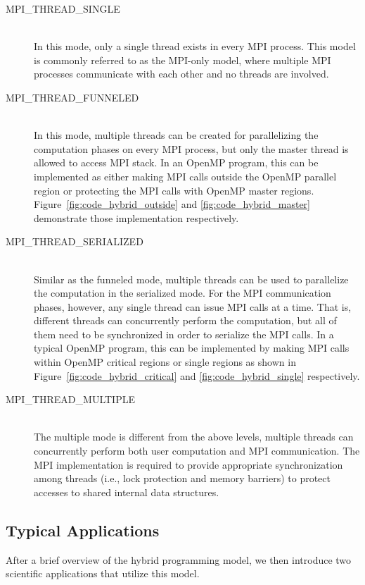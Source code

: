 \begin{description}
\item[MPI\_THREAD\_SINGLE] \hfill \\
In this mode, only a single thread exists in every MPI process. This
model is commonly referred to as the MPI-only model, where multiple
MPI processes communicate with each other and no threads are involved.

\item[MPI\_THREAD\_FUNNELED] \hfill \\
In this mode, multiple threads can be created for parallelizing the
computation phases on every MPI process, but only the master thread is
allowed to access MPI stack. In an OpenMP program, this can be implemented
as either making MPI calls outside the OpenMP parallel region or protecting
the MPI calls with OpenMP master regions. Figure~\ref{fig:code_hybrid_outside}
and \ref{fig:code_hybrid_master} demonstrate those implementation
respectively.

\item[MPI\_THREAD\_SERIALIZED] \hfill \\
Similar as the funneled mode, multiple threads can be used to parallelize
the computation in the serialized mode. For the MPI communication phases,
however, any single thread can issue MPI calls at a time. That is, different
threads can concurrently perform the computation, but all of them need to
be synchronized in order to serialize the MPI calls.  In a typical OpenMP
program, this can be implemented by making MPI calls within OpenMP critical
regions or single regions as shown in Figure~\ref{fig:code_hybrid_critical}
and \ref{fig:code_hybrid_single} respectively.

\item[MPI\_THREAD\_MULTIPLE] \hfill \\
The multiple mode is different from the above levels, multiple threads
can concurrently perform both user computation and MPI communication.
The MPI implementation is required to provide appropriate synchronization
among threads (i.e., lock protection and memory barriers) to protect
accesses to shared internal data structures.

\end{description}

\subsection{Typical Applications}
After a brief overview of the hybrid programming model, we then introduce
two scientific applications that utilize this model.

